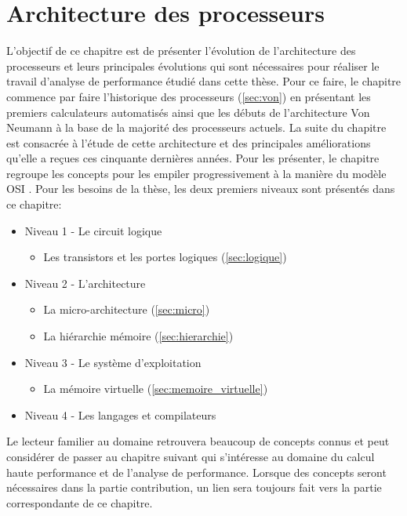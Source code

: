\chapter{Architecture des processeurs}
\label{chap:sota:materiel} \label{annexe:CHAPITRE_ARCHITECTURE}
\minitoc


L'objectif de ce chapitre est de présenter l'évolution de l'architecture des processeurs et leurs principales évolutions qui sont nécessaires pour réaliser le travail d'analyse de performance étudié dans cette thèse. 
Pour ce faire, le chapitre commence par faire l'historique des processeurs (\autoref{sec:von}) en présentant les premiers calculateurs automatisés ainsi que les débuts de l'architecture Von Neumann à la base de la majorité des processeurs actuels. 
La suite du chapitre est consacrée à l'étude de cette architecture et des principales améliorations qu'elle a reçues ces cinquante dernières années. Pour les présenter, le chapitre regroupe les concepts pour les empiler progressivement à la manière du modèle OSI   \cite{day1983osi}. Pour les besoins de la thèse, les deux premiers niveaux sont présentés dans ce chapitre:
\begin{itemize}
    \item Niveau 1 - Le circuit logique 
        \begin{itemize}
        \item Les transistors et les portes logiques (\autoref{sec:logique})
        \end{itemize}
    \item Niveau 2 - L'architecture 
    \begin{itemize}
        \item La micro-architecture (\autoref{sec:micro})
        \item La hiérarchie mémoire (\autoref{sec:hierarchie})
    \end{itemize}
    \item Niveau 3 - Le système d'exploitation
        \begin{itemize}
            \item La mémoire virtuelle  (\autoref{sec:memoire_virtuelle})
        \end{itemize}
    \item Niveau 4 - Les langages et compilateurs
\end{itemize}

Le lecteur familier au domaine retrouvera beaucoup de concepts connus et peut considérer de passer au chapitre suivant qui s'intéresse au domaine du calcul haute performance et de l'analyse de performance. Lorsque des concepts seront nécessaires dans la partie contribution, un lien sera toujours fait vers la partie correspondante de ce chapitre.



